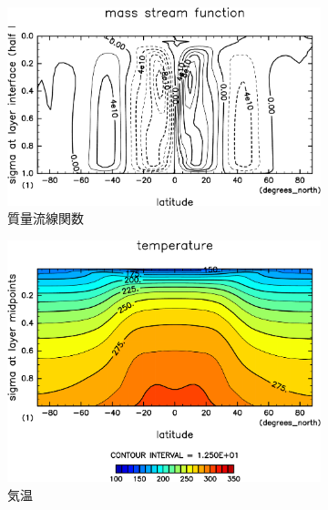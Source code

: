 \documentclass[body]{subfiles}
\begin{document}
\begin{figure}[t]
\begin{subfigure}{.4\textwidth}
		\centering
		\includegraphics[width=\columnwidth]{S1366-nc/MSF,time=3650:4015-crop-rotate.pdf}
		\caption{質量流線関数\hmu*{[kg/s]}}\label{S1366nc質量流線関数}
	\end{subfigure}
	\begin{subfigure}{.4\textwidth}
		\centering
		\includegraphics[width=\columnwidth]{S1366-nc/Temp,time=3650:4015-crop-rotate.pdf}
		\caption{気温\hmu*{[K]}}\label{S1366nc気温分布}
	\end{subfigure}
	\begin{subfigure}{.4\textwidth}
		\centering

\end{subfigure}
\end{figure}
\end{document}
